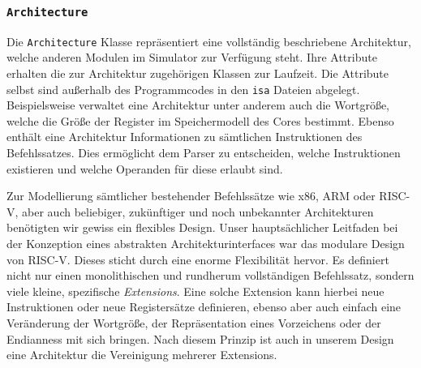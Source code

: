 
\subsubsection{\texttt{Architecture}}

Die \texttt{Architecture} Klasse repräsentiert eine vollständig beschriebene
Architektur, welche anderen Modulen im Simulator zur Verfügung steht. Ihre
Attribute erhalten die zur Architektur zugehörigen Klassen zur Laufzeit. Die Attribute selbst sind
außerhalb des Programmcodes in den \texttt{isa} Dateien abgelegt.
Beispielsweise verwaltet eine Architektur unter anderem auch die Wortgröße,
 welche die Größe der Register im Speichermodell des Cores
bestimmt. Ebenso enthält eine Architektur Informationen zu sämtlichen
Instruktionen des Befehlssatzes. Dies ermöglicht dem Parser zu entscheiden, welche
Instruktionen existieren und welche Operanden für diese erlaubt sind.

Zur Modellierung sämtlicher bestehender Befehlssätze wie x86, ARM oder RISC-V,
aber auch beliebiger, zukünftiger und noch unbekannter Architekturen benötigten
wir gewiss ein flexibles Design. Unser hauptsächlicher Leitfaden bei der
Konzeption eines abstrakten Architekturinterfaces war das modulare Design von
RISC-V. Dieses sticht durch eine enorme Flexibilität hervor. Es definiert nicht nur einen
monolithischen und rundherum vollständigen Befehlssatz, sondern viele
kleine, spezifische \emph{Extensions}. Eine solche Extension kann hierbei neue
Instruktionen oder neue Registersätze definieren, ebenso aber auch einfach eine
Veränderung der Wortgröße, der Repräsentation eines Vorzeichens oder der
Endianness mit sich bringen. Nach diesem Prinzip ist auch in unserem Design eine
Architektur die Vereinigung mehrerer Extensions.


